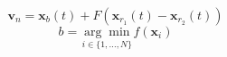 \begin{equation}
\mathbf{v}_{n}=\mathbf{x}_{b}(t)+F\left(\mathbf{x}_{r_{1}}(t)-\mathbf{x}_{r_{2}}(t)\right)
\label{best_mutation}
\end{equation}
$$
b=\underset{i \in\{1, \ldots, N\}}{\arg \min } f\left(\mathbf{x}_{i}\right)
$$